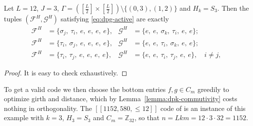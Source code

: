 \begin{lemma}[$S_3$ ansatzes at $L=12$, $J=3$]\label{lemma:s3-ansatz}
Let $L=12$, $J=3$, $\Gamma = \left([\frac L2]\times [\frac L2]\right)\setminus\{(0,3),(1,2)\}$ and $H_k = S_3$. Then the tuples $(\mathcal F^H,\mathcal G^H)$ satisfying \eqref{eq:dpg-active} are exactly
\begin{align}
    \mathcal{F}^H &= \{\sigma_j,\ \tau_i,\ e,\ e,\ e,\ e\},
        & \mathcal{G}^H &= \{e,\ e,\ \sigma_k,\ \tau_i,\ e,\ e\};\label{eq:ansatz-a}\\
    \mathcal{F}^H &= \{\tau_i,\ \sigma_j,\ e,\ e,\ e,\ e\},
        & \mathcal{G}^H &= \{e,\ e,\ \tau_i,\ \sigma_k,\ e,\ e\};\label{eq:ansatz-b}\\
    \mathcal{F}^H &= \{\tau_i,\ \tau_j,\ e,\ e,\ e,\ e\},
        & \mathcal{G}^H &= \{e,\ e,\ \tau_i,\ \tau_j,\ e,\ e\}, \quad i\neq j,\label{eq:ansatz-c}
\end{align}
\end{lemma}

\begin{proof}
It is easy to check exhaustively.
\end{proof}

To get a valid code we then choose the bottom entries $f,g\in C_m$ greedily to optimize girth and distance, which by Lemma~\ref{lemma:dpk-commutivity} costs nothing in orthogonality. The $[[1152,580,\leq12]]$ code of \cite{zhao2026ultrahighratequantumerrorcorrection} is an instance of this example with $k = 3$, $H_3 = S_3$ and $C_m = \mathbb Z_{32}$, so that $n = Lkm = 12\cdot3\cdot32 = 1152$. 


